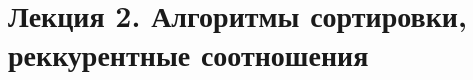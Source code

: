 \documentclass[../main.tex]{subfiles}
\begin{document}
	\section*{Лекция 2. Алгоритмы сортировки, реккурентные соотношения}
	
	
\end{document}
